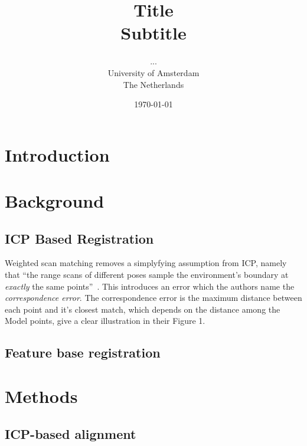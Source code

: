 \documentclass[a4paper]{article}
\title{Title\\
{\large Subtitle}}
\author{...\\
  University of Amsterdam\\
  The Netherlands}
\date{\today}
\begin{document}
\maketitle

\section{Introduction}

\section{Background}

\subsection{ICP Based Registration}

Weighted scan matching removes a simplyfying assumption from ICP, namely that ``the range scans of different poses sample the environment's boundary at \emph{exactly} the same points''~\cite{pfister2002weighted}. This introduces an error which the authors name the \emph{correspondence error}. The correspondence error is the maximum distance between each point and it's closest match, which depends on the distance among the Model points, \cite{slamet2008boosting} give a clear illustration in their Figure 1. 


\subsection{Feature base registration}

\section{Methods}

\subsection{ICP-based alignment}




{}

\end{document}
